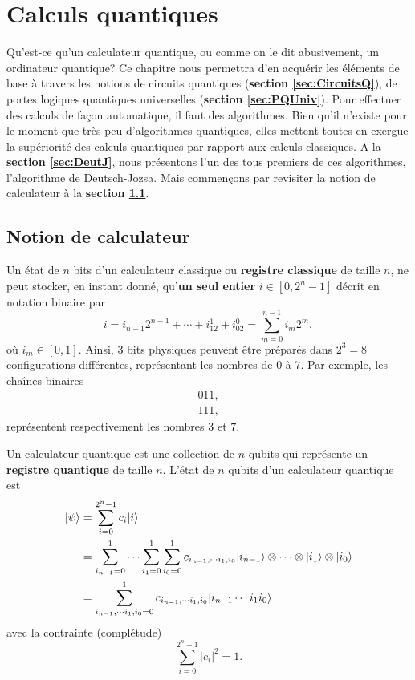 \chapter{Calculs quantiques}
\label{sec:CalQ}
\minitoc

\bigskip

Qu'est-ce qu'un calculateur quantique, ou comme on le dit abusivement, un
ordinateur quantique? Ce chapitre nous permettra d'en acquérir les éléments de
base à travers les notions de circuits quantiques (\textbf{section
\ref{sec:CircuitsQ}}), de portes logiques quantiques universelles
(\textbf{section \ref{sec:PQUniv}}). Pour effectuer des calculs de façon
automatique, il faut des algorithmes. Bien qu'il n'existe pour le moment que
très peu d'algorithmes quantiques, elles mettent toutes en exergue la
supériorité des calculs quantiques par rapport aux calculs classiques. A la
\textbf{section \ref{sec:DeutJ}}, nous présentons l'un des tous premiers de ces
algorithmes, l'algorithme de Deutsch-Jozsa. Mais commençons par revisiter la
notion de calculateur à la \textbf{section \ref{sec:calc}}.

\section{Notion de calculateur}
\label{sec:calc}

Un état de $n$ bits d'un calculateur classique ou \textbf{registre classique}
de taille $n$, ne peut stocker, en instant donné, qu'\textbf{un seul entier}
$i\in[0,2^n-1]$ décrit en notation binaire par%
\begin{equation}
i=i_{n-1}2^{n-1}+\cdots+i_12^1+i_02^0=\sum_{m=0}^{n-1}i_{m}2^{m},
\end{equation}
où $i_{m}\in[0,1]$. Ainsi, $3$ bits physiques peuvent être préparés dans
$2^{3}=8$ configurations différentes, représentant les nombres de $0$ à $7$.
Par exemple, les chaînes binaires%
\begin{subequations}%
\begin{align}
011,\\
111,
\end{align}%
\end{subequations}%
représentent respectivement les nombres $3$ et $7$.

Un calculateur quantique est une collection de $n$ qubits qui représente un
\textbf{registre quantique} de taille $n$. L'état de $n$ qubits d'un
calculateur quantique est%
\begin{equation}%
\label{eq:QSuperp}%
\begin{split}
\ket{\psi} &  =\sum_{i=0}^{2^n-1}c_{i}\ket{i} \\
&  =\sum_{i_{n-1}=0}^1\cdots\sum_{i_1=0}^1\sum_{i_0=0}^1c_{i_{n-1},
\cdots i_1,i_0}\ket{i_{n-1}}\otimes\cdots\otimes\ket{i_1}
\otimes\ket{i_0} \\
&  =\sum_{i_{n-1},\cdots i_1,i_0=0}^1c_{i_{n-1},\cdots i_1,i_0}
\ket{i_{n-1}\cdots i_1i_0}
\end{split}%
\end{equation}%
avec la contrainte (complétude)%
\begin{equation}
\sum_{i=0}^{2^n-1}|c_{i}|^2=1.
\label{eq:Complet2}%
\end{equation}

